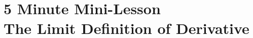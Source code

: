 \documentclass{article}
\begin{document}
\section*{{\small 5 Minute Mini-Lesson} \\ The Limit Definition of Derivative}
\end{document}
